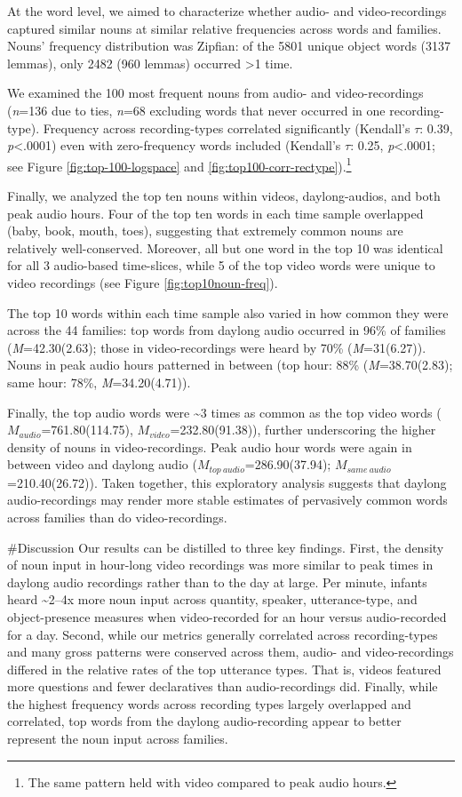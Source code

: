\documentclass[man]{apa6}
\theoremstyle{definition}
\theoremstyle{definition}
\theoremstyle{definition}
\theoremstyle{remark}
\begin{document}
At the word level, we aimed to characterize whether audio- and
video-recordings captured similar nouns at similar relative frequencies
across words and families. Nouns' frequency distribution was Zipfian: of
the 5801 unique object words (3137 lemmas), only 2482 (960 lemmas)
occurred \textgreater{}1 time.

We examined the 100 most frequent nouns from audio- and video-recordings
(\emph{n}=136 due to ties, \emph{n}=68 excluding words that never
occurred in one recording-type). Frequency across recording-types
correlated significantly (Kendall's \(\tau\): 0.39,
\emph{p}\textless{}.0001) even with zero-frequency words included
(Kendall's \(\tau\): 0.25, \emph{p}\textless{}.0001; see Figure
\ref{fig:top-100-logspace} and
\ref{fig:top100-corr-rectype}).\footnote{The same pattern held with video compared to peak audio hours.}

Finally, we analyzed the top ten nouns within videos, daylong-audios,
and both peak audio hours. Four of the top ten words in each time sample
overlapped (baby, book, mouth, toes), suggesting that extremely common
nouns are relatively well-conserved. Moreover, all but one word in the
top 10 was identical for all 3 audio-based time-slices, while 5 of the
top video words were unique to video recordings (see Figure
\ref{fig:top10noun-freq}).

The top 10 words within each time sample also varied in how common they
were across the 44 families: top words from daylong audio occurred in
96\% of families (\emph{M}=42.30(2.63); those in video-recordings were
heard by 70\% (\emph{M}=31(6.27)). Nouns in peak audio hours patterned
in between (top hour: 88\% (\emph{M}=38.70(2.83); same hour: 78\%,
\emph{M}=34.20(4.71)).

Finally, the top audio words were \textasciitilde{}3 times as common as
the top video words (\(M_{audio}\)=761.80(114.75),
\(M_{video}\)=232.80(91.38)), further underscoring the higher density of
nouns in video-recordings. Peak audio hour words were again in between
video and daylong audio (\(M_{top\ audio}\)=286.90(37.94);
\(M_{same\ audio}\)=210.40(26.72)). Taken together, this exploratory
analysis suggests that daylong audio-recordings may render more stable
estimates of pervasively common words across families than do
video-recordings.

\#Discussion Our results can be distilled to three key findings. First,
the density of noun input in hour-long video recordings was more similar
to peak times in daylong audio recordings rather than to the day at
large. Per minute, infants heard \textasciitilde{}2--4x more noun input
across quantity, speaker, utterance-type, and object-presence measures
when video-recorded for an hour versus audio-recorded for a day. Second,
while our metrics generally correlated across recording-types and many
gross patterns were conserved across them, audio- and video-recordings
differed in the relative rates of the top utterance types. That is,
videos featured more questions and fewer declaratives than
audio-recordings did. Finally, while the highest frequency words across
recording types largely overlapped and correlated, top words from the
daylong audio-recording appear to better represent the noun input across
families.
\end{document}
